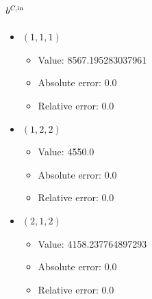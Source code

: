 \documentclass{article}%
\begin{document}
\subsection{$b^{\textsl{C},\text{in}}$}%
\begin{itemize}%
	\item $(1, 1, 1)$%
	\begin{itemize}%
		\item Value: 8567.195283037961%
		\item Absolute error: 0.0%
		\item Relative error: 0.0%
	\end{itemize}%
	\item $(1, 2, 2)$%
	\begin{itemize}%
		\item Value: 4550.0%
		\item Absolute error: 0.0%
		\item Relative error: 0.0%
	\end{itemize}%
	\item $(2, 1, 2)$%
	\begin{itemize}%
		\item Value: 4158.237764897293%
		\item Absolute error: 0.0%
		\item Relative error: 0.0%
	\end{itemize}%
\end{itemize}%
\end{document}
